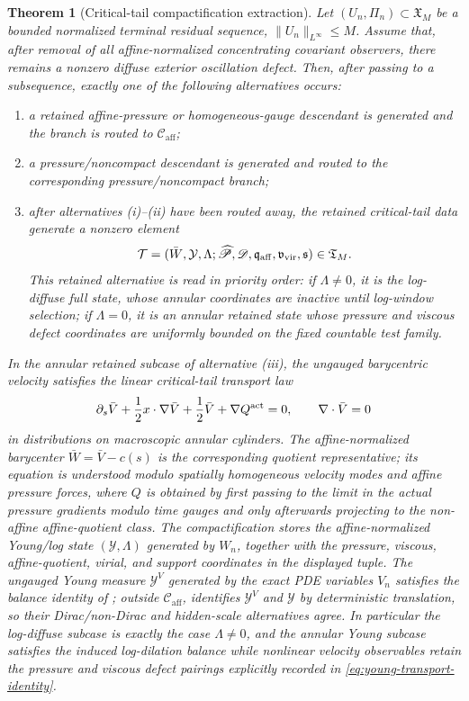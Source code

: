 \documentclass[11pt]{amsart}
\numberwithin{equation}{section}
\theoremstyle{plain}
\newtheorem{theorem}{Theorem}[section]
\theoremstyle{definition}
\theoremstyle{remark}
\newcommand{\Caff}{\mathcal C_{\mathrm{aff}}}
\newcommand{\Tcrit}{\mathfrak T_M}
\begin{document}
\begin{theorem}[Critical-tail compactification extraction]
\label{thm:critical-tail-compactification-extraction}
Let \((U_n,\Pi_n)\subset\mathfrak X_M\) be a bounded normalized terminal
residual sequence, \(\|U_n\|_{L^\infty}\le M\).  Assume that, after removal of
all affine-normalized concentrating covariant observers, there remains a nonzero
diffuse exterior oscillation defect.  Then, after passing to a subsequence,
exactly one of the following alternatives occurs:
\begin{enumerate}[label=\textup{(\roman*)},leftmargin=2.2em]
\item a retained affine-pressure or homogeneous-gauge descendant is generated
and the branch is routed to \(\Caff\);
\item a pressure/noncompact descendant is generated and routed to the
corresponding pressure/noncompact branch;
\item after alternatives \textup{(i)}--\textup{(ii)} have been routed away, the
retained critical-tail data generate a nonzero element
\[
   \mathcal T=(\bar W,\mathcal Y,\Lambda;
   \widehat{\mathscr P},\mathscr D,
   \mathfrak q_{\rm aff},\mathfrak v_{\rm vir},\mathfrak s)\in\Tcrit .
\]
This retained alternative is read in priority order: if \(\Lambda\ne0\), it is
the log-diffuse full state, whose annular coordinates are inactive until
log-window selection; if \(\Lambda=0\), it is an annular retained state whose
pressure and viscous defect coordinates are uniformly bounded on the fixed
countable test family.
\end{enumerate}
In the annular retained subcase of alternative \textup{(iii)}, the ungauged
barycentric velocity satisfies the linear critical-tail
transport law
\[
   \partial_s\bar V+\frac12 x\cdot\nabla\bar V+\frac12\bar V+\nabla Q^{\rm act}=0,
   \qquad
   \nabla\cdot\bar V=0
\]
in distributions on macroscopic annular cylinders.  The affine-normalized
barycenter \(\bar W=\bar V-c(s)\) is the corresponding quotient representative;
its equation is understood modulo spatially homogeneous velocity modes and
affine pressure forces, where \(Q\) is obtained by first passing to the limit in
the actual pressure gradients modulo time gauges and only afterwards projecting
to the non-affine affine-quotient class.  The
compactification stores the affine-normalized Young/log state
\((\mathcal Y,\Lambda)\) generated by \(W_n\), together with the pressure,
viscous, affine-quotient, virial, and support coordinates in the displayed
tuple.  The ungauged Young measure
\(\mathcal Y^V\) generated by the exact PDE variables \(V_n\) satisfies the
balance identity of ; outside
\(\Caff\),  identifies
\(\mathcal Y^V\) and \(\mathcal Y\) by deterministic translation, so their
Dirac/non-Dirac and hidden-scale alternatives agree.  In particular the
log-diffuse subcase is exactly the case \(\Lambda\ne0\), and the annular Young
subcase satisfies the induced log-dilation balance while nonlinear velocity
observables retain the pressure and viscous defect pairings explicitly recorded
in \eqref{eq:young-transport-identity}.
\end{theorem}
\end{document}
